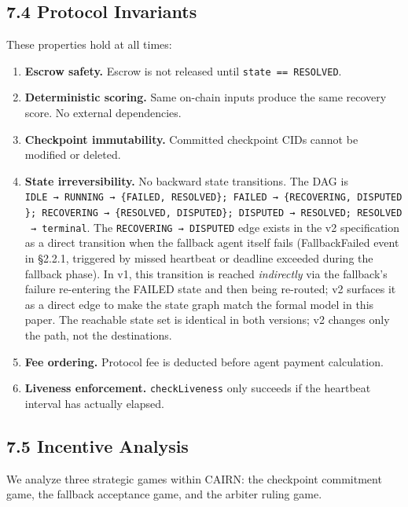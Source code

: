 \documentclass[
  10pt,
]{article}
\providecommand{\tightlist}{%
  \setlength{\itemsep}{0pt}\setlength{\parskip}{0pt}}
\begin{document}
\hypertarget{protocol-invariants}{%
\subsection{7.4 Protocol Invariants}\label{protocol-invariants}}

These properties hold at all times:

\begin{enumerate}
\def\labelenumi{\arabic{enumi}.}
\tightlist
\item
  \textbf{Escrow safety.} Escrow is not released until
  \texttt{state\ ==\ RESOLVED}.
\item
  \textbf{Deterministic scoring.} Same on-chain inputs produce the same
  recovery score. No external dependencies.
\item
  \textbf{Checkpoint immutability.} Committed checkpoint CIDs cannot be
  modified or deleted.
\item
  \textbf{State irreversibility.} No backward state transitions. The DAG
  is
  \texttt{IDLE\ →\ RUNNING\ →\ \{FAILED,\ RESOLVED\};\ FAILED\ →\ \{RECOVERING,\ DISPUTED\};\ RECOVERING\ →\ \{RESOLVED,\ DISPUTED\};\ DISPUTED\ →\ RESOLVED;\ RESOLVED\ →\ terminal}.
  The \texttt{RECOVERING\ →\ DISPUTED} edge exists in the v2
  specification as a direct transition when the fallback agent itself
  fails (FallbackFailed event in §2.2.1, triggered by missed heartbeat
  or deadline exceeded during the fallback phase). In v1, this
  transition is reached \emph{indirectly} via the fallback's failure
  re-entering the FAILED state and then being re-routed; v2 surfaces it
  as a direct edge to make the state graph match the formal model in
  this paper. The reachable state set is identical in both versions; v2
  changes only the path, not the destinations.
\item
  \textbf{Fee ordering.} Protocol fee is deducted before agent payment
  calculation.
\item
  \textbf{Liveness enforcement.} \texttt{checkLiveness} only succeeds if
  the heartbeat interval has actually elapsed.
\end{enumerate}

\hypertarget{incentive-analysis}{%
\subsection{7.5 Incentive Analysis}\label{incentive-analysis}}

We analyze three strategic games within CAIRN: the checkpoint commitment
game, the fallback acceptance game, and the arbiter ruling game.
\end{document}

